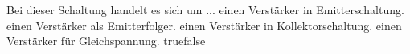     {Bei dieser Schaltung handelt es sich um ...}
    {einen Verstärker in Emitterschaltung.}
    {einen Verstärker als Emitterfolger.}
    {einen Verstärker in Kollektorschaltung.}
    {einen Verstärker für Gleichspannung.}
    {true}{false}